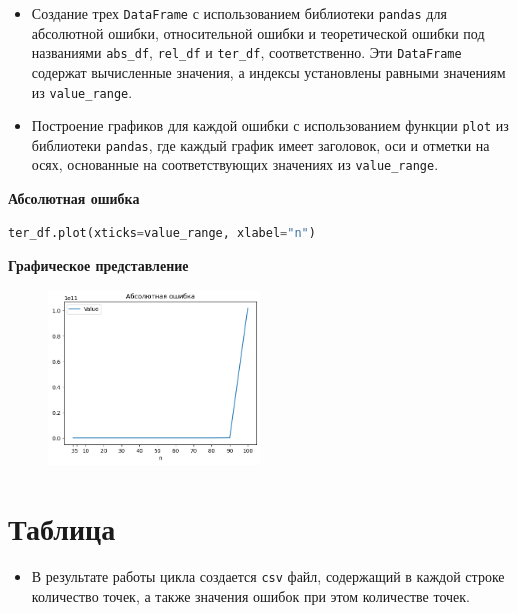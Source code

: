 \documentclass{article}
\begin{document}
\begin{itemize}
\item Создание трех \texttt{DataFrame} с использованием библиотеки \texttt{pandas} для абсолютной ошибки, относительной ошибки и теоретической ошибки под названиями \texttt{abs\_df}, \texttt{rel\_df} и \texttt{ter\_df}, соответственно. Эти \texttt{DataFrame} содержат вычисленные значения, а индексы установлены равными значениям из \texttt{value\_range}.

\item Построение графиков для каждой ошибки с использованием функции \texttt{plot} из библиотеки \texttt{pandas}, где каждый график имеет заголовок, оси и отметки на осях, основанные на соответствующих значениях из \texttt{value\_range}.

\end{itemize}

\textbf{\large{Абсолютная ошибка}}
\begin{lstlisting}[language=Python]
ter_df.plot(xticks=value_range, xlabel="n")
\end{lstlisting}
\textbf{Графическое представление}
    

\begin{figure}[h]
    \centering
    \includegraphics[width=0.5\textwidth]{output1.png}
    \label{fig:my_label}
\end{figure}

\section{Таблица}

\begin{itemize}
\item В результате работы цикла создается \texttt{csv} файл, содержащий в каждой
строке количество точек, а также значения ошибок при этом количестве точек. 
\end{itemize}
\end{document}

